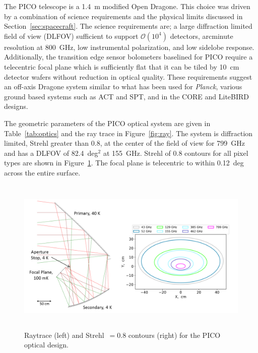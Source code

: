 \documentclass[]{spie}  %
\begin{document}
The PICO telescope is a 1.4~m modified Open Dragone.  This choice was driven by a combination of science requirements and the physical limits 
discussed in Section~\ref{sec:spacecraft}.  The science requirements are; a large diffraction limited field of view (DLFOV) sufficient to 
support $\mathcal{O}(10^4)$ detectors, arcminute resolution at 800~GHz, low instrumental polarization, and low sidelobe response. Additionally, 
the transition edge sensor bolometers baselined for PICO require a telecentric focal plane which is sufficiently flat that it can be tiled by 
10~cm detector wafers without reduction in optical quality. These requirements suggest an off-axis Dragone system\cite{dragone} similar 
to what has been used for \textit{Planck}\cite{planck2000_optics}, various ground based systems such as ACT\cite{ACT2011_optics} and SPT\cite{SPT2008_optics}, 
and in the CORE\cite{core2018_inst} and LiteBIRD\cite{LB2016_optics} designs.

The geometric parameters of the PICO optical system are given in Table~\ref{tab:optics} and the ray trace in Figure~\ref{fig:ray}. The 
system is diffraction limited, Strehl greater than 0.8, at the center of the field of view for 799~GHz and has a DLFOV of 82.4~deg$^2$ at 
155~GHz.  Strehl of 0.8 contours for all pixel types are shown in Figure~\ref{fig:strehl}. The %
focal plane is telecentric to within 0.12~deg across the entire surface.

\begin{figure} [ht]
\begin{center}
\includegraphics[height=7.5cm]{jpl_ray_strehl.png}
\end{center}
\caption { \label{fig:ray} \label{fig:strehl} 
Raytrace (left) and Strehl~$=0.8$ contours (right) for the PICO optical design.
}
\end{figure} 
\end{document}
